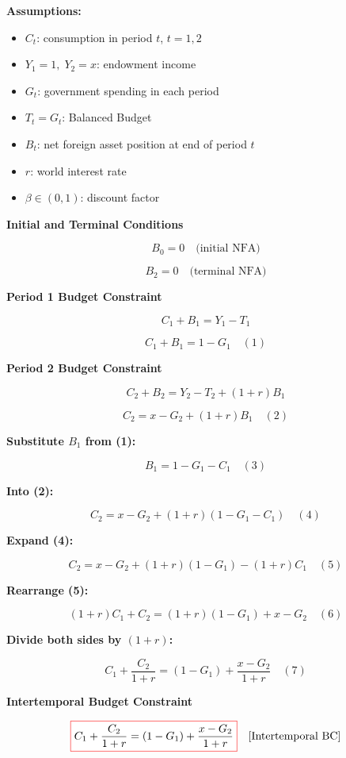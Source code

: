 \documentclass[12pt]{article}
\begin{document}
\textbf{Assumptions:}
\begin{itemize}
  \item \( C_t \): consumption in period \( t \), \( t = 1, 2 \)
  \item \( Y_1 = 1,\; Y_2 = x \): endowment income
  \item \( G_t \): government spending in each period
  \item \( T_t = G_t \): Balanced Budget
  \item \( B_t \): net foreign asset position at end of period \( t \)
  \item \( r \): world interest rate
  \item \( \beta \in (0,1) \): discount factor
\end{itemize}

\textbf{Initial and Terminal Conditions}

\[
B_0 = 0 \quad \text{(initial NFA)}
\]

\[
B_2 = 0 \quad \text{(terminal NFA)}
\]

\textbf{Period 1 Budget Constraint}

\[
C_1 + B_1 = Y_1 - T_1
\]

\[
C_1 + B_1 = 1 - G_1 \quad (1)
\]

\textbf{Period 2 Budget Constraint}

\[
C_2 + B_2 = Y_2 - T_2 + (1+r)B_1
\]

\[
C_2 = x - G_2 + (1+r)B_1 \quad (2)
\]

\textbf{Substitute \( B_1 \) from (1):}

\[
B_1 = 1 - G_1 - C_1 \quad (3)
\]

\textbf{Into (2):}

\[
C_2 = x - G_2 + (1+r)(1 - G_1 - C_1) \quad (4)
\]

\textbf{Expand (4):}

\[
C_2 = x - G_2 + (1+r)(1 - G_1) - (1+r)C_1 \quad (5)
\]

\textbf{Rearrange (5):}

\[
(1+r)C_1 + C_2 = (1+r)(1 - G_1) + x - G_2 \quad (6)
\]

\textbf{Divide both sides by \( (1+r) \):}

\[
C_1 + \frac{C_2}{1+r} = (1 - G_1) + \frac{x - G_2}{1+r} \quad (7)
\]

\textbf{Intertemporal Budget Constraint}

\[
\fcolorbox{red}{white}{$
\displaystyle
C_1 + \frac{C_2}{1+r} = (1 - G_1) + \frac{x - G_2}{1+r}
$} \quad \text{[Intertemporal BC]}
\]
\end{document}
